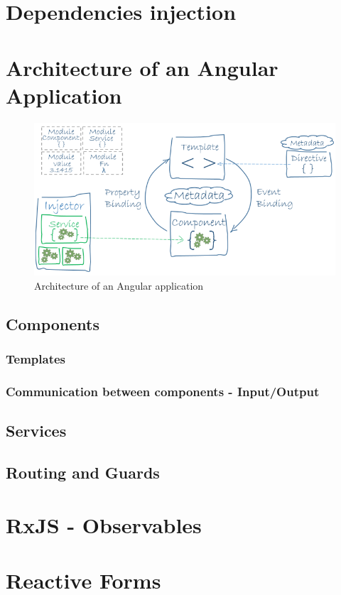 \documentclass[11pt,a4paper]{report}
\begin{document}
\section{Dependencies injection}
\section{Architecture of an Angular Application}
\begin{figure}[H]
\begin{center}
	\includegraphics[width=.8\textwidth]{assets/angular_architecture}
	\caption{Architecture of an Angular application\cite{angular:ref:architecture}}
\end{center}
\end{figure}
\subsection{Components}
\subsubsection{Templates}
\subsubsection{Communication between components - Input/Output}
\subsection{Services}
\subsection{Routing and Guards}
\section{RxJS - Observables}
\section{Reactive Forms}
\end{document}

